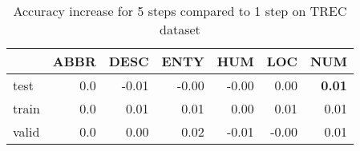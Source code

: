\begin{table}[H]
\begin{center}

\begin{tabular}{lrrrrrr}
\toprule
{} &  ABBR &  DESC &  ENTY &  HUM &  LOC &  NUM \\
\midrule
test  &     0.0 &     -0.01 &     -0.00 &    -0.00 &     0.00 &     \textbf{0.01} \\
train &     0.0 &      0.01 &      0.01 &     0.00 &     0.01 &     0.01 \\
valid &     0.0 &      0.00 &      0.02 &    -0.01 &    -0.00 &     0.01 \\
\bottomrule
\end{tabular}

\caption[Accuracy increase for 5 steps compared to 1 step on TREC dataset]{Accuracy increase for 5 steps compared to 1 step on TREC dataset}
\label{tab:multiw:trec:5}
\end{center}
\end{table}

